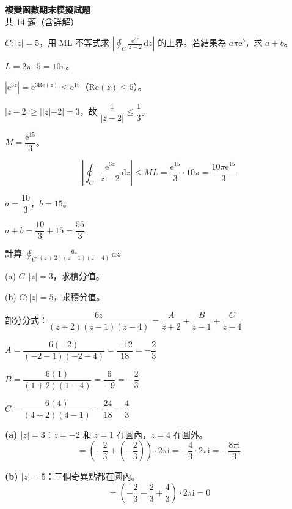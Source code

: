 \documentclass[12pt,a4paper]{article}
\newcommand{\dd}{\,\mathrm{d}}
\newcommand{\ii}{\mathrm{i}}
\newcommand{\ee}{\mathrm{e}}
\begin{document}
\begin{center}
{\LARGE\bfseries 複變函數期末模擬試題}\\[6pt]
{\large 共 14 題（含詳解）}\\[4pt]
\end{center}

\bigskip

\begin{qbox}[第 1 題\,---\,ML 不等式]
$C:|z|=5$，用 ML 不等式求 $\displaystyle\left|\oint_C\frac{\ee^{3z}}{z-2}\dd{z}\right|$ 的上界。若結果為 $a\pi\ee^b$，求 $a+b$。
\end{qbox}

\begin{solbox}[解]
$L=2\pi\cdot 5=10\pi$。

$|\ee^{3z}|=\ee^{3\text{Re}(z)}\le\ee^{15}$（$\text{Re}(z)\le 5$）。

$|z-2|\ge||z|-2|=3$，故 $\dfrac{1}{|z-2|}\le\dfrac{1}{3}$。

$M=\dfrac{\ee^{15}}{3}$。

$$\left|\oint_C\frac{\ee^{3z}}{z-2}\dd{z}\right|\le ML=\frac{\ee^{15}}{3}\cdot 10\pi=\frac{10\pi\ee^{15}}{3}$$

$a=\dfrac{10}{3}$，$b=15$。
\end{solbox}

\begin{ansbox}
$a+b=\dfrac{10}{3}+15=\boxed{\dfrac{55}{3}}$
\end{ansbox}

\begin{qbox}
計算 $\displaystyle\oint_C\frac{6z}{(z+2)(z-1)(z-4)}\dd{z}$

(a) $C:|z|=3$，求積分值。

(b) $C:|z|=5$，求積分值。
\end{qbox}

\begin{solbox}[解]
部分分式：$\dfrac{6z}{(z+2)(z-1)(z-4)}=\dfrac{A}{z+2}+\dfrac{B}{z-1}+\dfrac{C}{z-4}$

$A=\dfrac{6(-2)}{(-2-1)(-2-4)}=\dfrac{-12}{18}=-\dfrac{2}{3}$

$B=\dfrac{6(1)}{(1+2)(1-4)}=\dfrac{6}{-9}=-\dfrac{2}{3}$

$C=\dfrac{6(4)}{(4+2)(4-1)}=\dfrac{24}{18}=\dfrac{4}{3}$

\textbf{(a) $|z|=3$}：$z=-2$ 和 $z=1$ 在圓內，$z=4$ 在圓外。
$$=\left(-\frac{2}{3}+\left(-\frac{2}{3}\right)\right)\cdot 2\pi\ii=-\frac{4}{3}\cdot 2\pi\ii=-\frac{8\pi\ii}{3}$$

\textbf{(b) $|z|=5$}：三個奇異點都在圓內。
$$=\left(-\frac{2}{3}-\frac{2}{3}+\frac{4}{3}\right)\cdot 2\pi\ii=0$$
\end{solbox}
\end{document}
